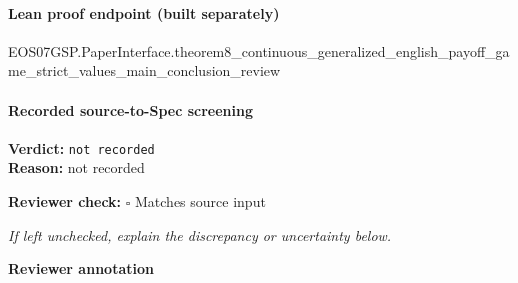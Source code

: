 \documentclass[10pt]{article}
\newcommand{\reviewerbox}{%
  \par\noindent\fbox{\parbox{0.96\linewidth}{\rule{0pt}{0.38in}}}\par
}
\newcommand{\reviewmatch}[1]{%
  \par\noindent\textbf{Reviewer check:} $\square$\; #1\par
  \noindent\emph{If left unchecked, explain the discrepancy or uncertainty below.}\par
}
\begin{document}
\paragraph{Lean proof endpoint (built separately)}\begin{ReviewVerbatim}
EOS07GSP.PaperInterface.theorem8_continuous_generalized_english_payoff_game_strict_values_main_conclusion_review
\end{ReviewVerbatim}

\paragraph{Recorded source-to-Spec screening}
\textbf{Verdict:} \texttt{not recorded}
\\
\textbf{Reason:} not recorded
\reviewmatch{Matches source input}
\noindent\textbf{Reviewer annotation}\par
\reviewerbox
\end{document}
